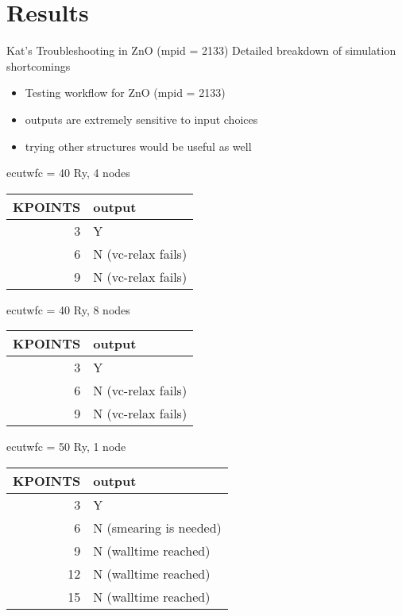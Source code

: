 \documentclass[8pt, compress]{beamer}
\begin{document}
\section{Results}
\label{sec:orgeebf0b9}
\begin{frame}[allowframebreaks]{Kat's Troubleshooting in ZnO (mpid = 2133)}
Detailed breakdown of simulation shortcomings
\begin{itemize}
\item Testing workflow for ZnO (mpid = 2133)
\item outputs are \alert{extremely} sensitive to input choices
\item trying other structures would be useful as well
\end{itemize}
\begin{block}{ecutwfc = 40 Ry, 4 nodes}
\begin{center}
\begin{tabular}{rl}
KPOINTS & output\\
\hline
3 & Y\\
6 & N (vc-relax fails)\\
9 & N (vc-relax fails)\\
\end{tabular}
\end{center}
\end{block}
\begin{block}{ecutwfc = 40 Ry, 8 nodes}
\begin{center}
\begin{tabular}{rl}
KPOINTS & output\\
\hline
3 & Y\\
6 & N (vc-relax fails)\\
9 & N (vc-relax fails)\\
\end{tabular}
\end{center}
\end{block}
\begin{block}{ecutwfc = 50 Ry, 1 node}
\begin{center}
\begin{tabular}{rl}
KPOINTS & output\\
\hline
3 & Y\\
6 & N (smearing is needed)\\
9 & N (walltime reached)\\
12 & N (walltime reached)\\
15 & N (walltime reached)\\
\end{tabular}
\end{center}

\end{block}
\end{frame}
\end{document}
